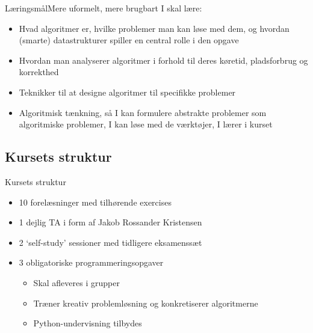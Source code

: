 \documentclass{beamer}
\begin{document}
\begin{frame}{Læringsmål}{Mere uformelt, mere brugbart}
    I skal lære:
    \pause
    \begin{itemize}
        \item Hvad algoritmer er, hvilke problemer man kan løse med dem, og
            hvordan (smarte) datastrukturer spiller en central rolle i den
            opgave
            \pause
        \item Hvordan man analyserer algoritmer i forhold til deres køretid,
            pladsforbrug og korrekthed
            \pause
        \item Teknikker til at designe algoritmer til specifikke problemer
            \pause
        \item Algoritmisk tænkning, så I kan formulere abstrakte problemer som
            algoritmiske problemer, I kan løse med de værktøjer, I lærer i
            kurset
    \end{itemize}
\end{frame}



\subsection[Struktur]{Kursets struktur}

\begin{frame}{Kursets struktur}
   \begin{itemize}
       \item 10 forelæsninger med tilhørende exercises \pause
       \item 1 dejlig TA i form af Jakob Rossander Kristensen \pause
       \item 2 `self-study' sessioner med tidligere eksamenssæt \pause
       \item 3 obligatoriske programmeringsopgaver \pause
           \begin{itemize}
               \item Skal afleveres i grupper
               \item Træner kreativ problemløsning og konkretiserer algoritmerne
               \item Python-undervisning tilbydes
           \end{itemize}
   \end{itemize} 
\end{frame}
\end{document}
